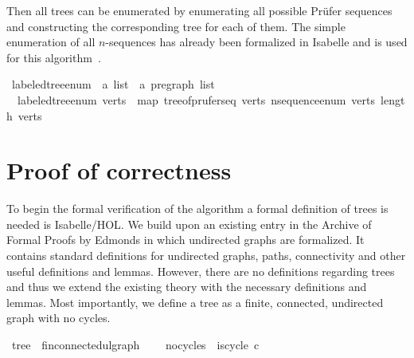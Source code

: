 Then all trees can be enumerated by enumerating all possible Prüfer sequences and constructing the corresponding tree for each of them.
The simple enumeration of all $n$-sequences has already been formalized in Isabelle and is used for this algorithm~\cite{Combinatorial_Enumeration_Algorithms-AFP}.

\begin{isabellebox}
    \isamarkupfalse%
    \ labeled{\isacharunderscore}{\kern0pt}tree{\isacharunderscore}{\kern0pt}enum\ {\isacharcolon}{\kern0pt}{\isacharcolon}{\kern0pt}\ {\isachardoublequoteopen}{\isacharprime}{\kern0pt}a\ list\ {\isasymRightarrow}\ {\isacharprime}{\kern0pt}a\ pregraph\ list{\isachardoublequoteclose}\ \isanewline
    \ \ {\isachardoublequoteopen}labeled{\isacharunderscore}{\kern0pt}tree{\isacharunderscore}{\kern0pt}enum\ verts\ {\isacharequal}{\kern0pt}\ map\ {\isacharparenleft}{\kern0pt}tree{\isacharunderscore}{\kern0pt}of{\isacharunderscore}{\kern0pt}prufer{\isacharunderscore}{\kern0pt}seq\ verts{\isacharparenright}{\kern0pt}\ {\isacharparenleft}{\kern0pt}n{\isacharunderscore}{\kern0pt}sequence{\isacharunderscore}{\kern0pt}enum\ verts\ {\isacharparenleft}{\kern0pt}length\ verts\ {\isacharminus}{\kern0pt}\ {}{\isacharparenright}{\kern0pt}{\isacharparenright}{\kern0pt}{\isachardoublequoteclose}%
\end{isabellebox}


\section{Proof of correctness}\label{section:labeled_tree_enum_correct}

To begin the formal verification of the algorithm a formal definition of trees is needed is Isabelle/HOL.
We build upon an existing entry in the Archive of Formal Proofs by Edmonds \cite{Undirected_Graph_Theory-AFP} in which undirected graphs are formalized.
It contains standard definitions for undirected graphs, paths, connectivity and other useful definitions and lemmas.
However, there are no definitions regarding trees and thus we extend the existing theory with the necessary definitions and lemmas.
Most importantly, we define a tree as a finite, connected, undirected graph with no cycles.

\begin{isabellebox}
    \isamarkupfalse%
    \ tree\ {\isacharequal}{\kern0pt}\ fin{\isacharunderscore}{\kern0pt}connected{\isacharunderscore}{\kern0pt}ulgraph\ {\isacharplus}{\kern0pt}\isanewline
    \ \ \ no{\isacharunderscore}{\kern0pt}cycles{\isacharcolon}{\kern0pt}\ {\isachardoublequoteopen}{\isasymnot}\ is{\isacharunderscore}{\kern0pt}cycle{}\ c{\isachardoublequoteclose}
\end{isabellebox}


